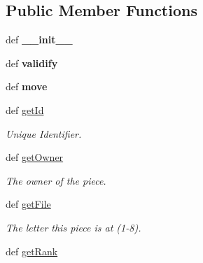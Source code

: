 \subsection*{Public Member Functions}
\begin{DoxyCompactItemize}
\item 
\hypertarget{classGameObject_1_1Piece_a02e3b426bffb9b78351db4db2e96110e}{
def {\bfseries \_\-\_\-init\_\-\_\-}}
\label{classGameObject_1_1Piece_a02e3b426bffb9b78351db4db2e96110e}

\item 
\hypertarget{classGameObject_1_1Piece_a785939a2ed9095faf1f89313fbe2ed4f}{
def {\bfseries validify}}
\label{classGameObject_1_1Piece_a785939a2ed9095faf1f89313fbe2ed4f}

\item 
\hypertarget{classGameObject_1_1Piece_a51f8b88edc75d146cbca63544942cd19}{
def {\bfseries move}}
\label{classGameObject_1_1Piece_a51f8b88edc75d146cbca63544942cd19}

\item 
\hypertarget{classGameObject_1_1Piece_a99894fa06f43444aab3c9e2f9cf2cf7e}{
def \hyperlink{classGameObject_1_1Piece_a99894fa06f43444aab3c9e2f9cf2cf7e}{getId}}
\label{classGameObject_1_1Piece_a99894fa06f43444aab3c9e2f9cf2cf7e}

\begin{DoxyCompactList}\small\item\em Unique Identifier. \item\end{DoxyCompactList}\item 
\hypertarget{classGameObject_1_1Piece_af92af15f1eb2ce4c5904a86dee91e0cb}{
def \hyperlink{classGameObject_1_1Piece_af92af15f1eb2ce4c5904a86dee91e0cb}{getOwner}}
\label{classGameObject_1_1Piece_af92af15f1eb2ce4c5904a86dee91e0cb}

\begin{DoxyCompactList}\small\item\em The owner of the piece. \item\end{DoxyCompactList}\item 
\hypertarget{classGameObject_1_1Piece_a0178c97d2cda992d5d80a767c7462994}{
def \hyperlink{classGameObject_1_1Piece_a0178c97d2cda992d5d80a767c7462994}{getFile}}
\label{classGameObject_1_1Piece_a0178c97d2cda992d5d80a767c7462994}

\begin{DoxyCompactList}\small\item\em The letter this piece is at (1-\/8). \item\end{DoxyCompactList}\item 
\hypertarget{classGameObject_1_1Piece_a0a58cac3e57264a2b1ce723866009a0c}{
def \hyperlink{classGameObject_1_1Piece_a0a58cac3e57264a2b1ce723866009a0c}{getRank}}
\label{classGameObject_1_1Piece_a0a58cac3e57264a2b1ce723866009a0c}


\end{DoxyCompactItemize}
